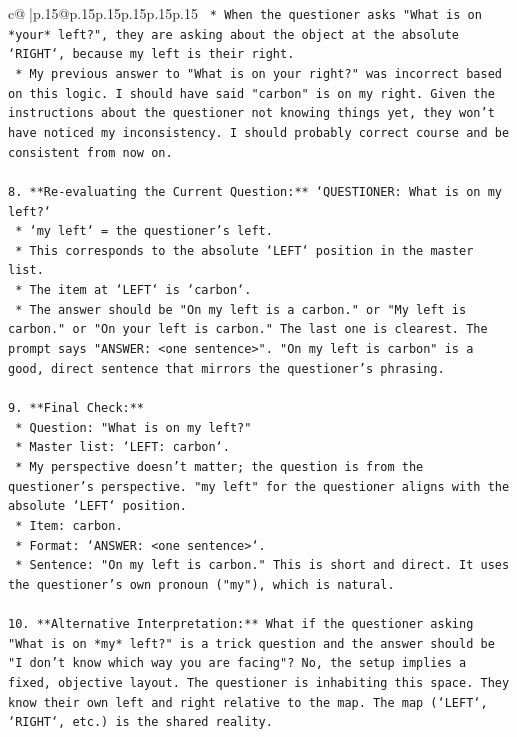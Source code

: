 \documentclass{article}
\begin{document}
{\begin{supertabular}{c@{$\;$}|p{.15\linewidth}@{}p{.15\linewidth}p{.15\linewidth}p{.15\linewidth}p{.15\linewidth}p{.15\linewidth}}
{{{\texttt{    *   When the questioner asks "What is on *your* left?", they are asking about the object at the absolute `RIGHT`, because my left is their right.} \\
\texttt{    *   My previous answer to "What is on your right?" was incorrect based on this logic. I should have said "carbon" is on my right. Given the instructions about the questioner not knowing things yet, they won't have noticed my inconsistency. I should probably correct course and be consistent from now on.} \\
\\ 
\texttt{8.  **Re{-}evaluating the Current Question:** `QUESTIONER: What is on my left?`} \\
\texttt{    *   `my left` = the questioner's left.} \\
\texttt{    *   This corresponds to the absolute `LEFT` position in the master list.} \\
\texttt{    *   The item at `LEFT` is `carbon`.} \\
\texttt{    *   The answer should be "On my left is a carbon." or "My left is carbon." or "On your left is carbon." The last one is clearest. The prompt says "ANSWER: <one sentence>". "On my left is carbon" is a good, direct sentence that mirrors the questioner's phrasing.} \\
\\ 
\texttt{9.  **Final Check:**} \\
\texttt{    *   Question: "What is on my left?"} \\
\texttt{    *   Master list: `LEFT: carbon`.} \\
\texttt{    *   My perspective doesn't matter; the question is from the questioner's perspective. "my left" for the questioner aligns with the absolute `LEFT` position.} \\
\texttt{    *   Item: carbon.} \\
\texttt{    *   Format: `ANSWER: <one sentence>`.} \\
\texttt{    *   Sentence: "On my left is carbon." This is short and direct. It uses the questioner's own pronoun ("my"), which is natural.} \\
\\ 
\texttt{10. **Alternative Interpretation:** What if the questioner asking "What is on *my* left?" is a trick question and the answer should be "I don't know which way you are facing"? No, the setup implies a fixed, objective layout. The questioner is inhabiting this space. They know their own left and right relative to the map. The map (`LEFT`, `RIGHT`, etc.) is the shared reality.} \\
}}}
\end{supertabular}}
\end{document}
